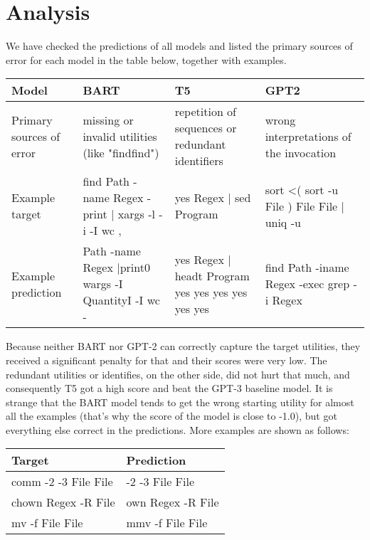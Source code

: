 \section{Analysis}
We have checked the predictions of all models and listed the primary sources of error for each model in the table below, together with examples.


\begin{center}
\begin{tabular}{ |M|L|L|L| } 
  \hline
  Model & BART & T5 & GPT2 \\ 
  \hline
  Primary sources of error & 
  missing or invalid utilities (like "findfind") & 
  repetition of sequences or redundant identifiers & 
  wrong interpretations of the invocation\\ 
  \hline
  Example target & find Path -name Regex -print | xargs -l -i -I {} wc {} {}, & 
  yes Regex | sed Program &
  sort <( sort -u File ) File File | uniq -u \\ 
  \hline
  Example prediction & 
  Path -name Regex |print0 wargs -I QuantityI -I {} wc - & yes Regex | headt Program yes yes yes yes yes yes & 
  find Path -iname Regex -exec grep -i Regex {}\\
  \hline
\end{tabular}
\end{center}

Because neither BART nor GPT-2 can correctly capture the target utilities, they received a significant penalty for that and their scores were very low. The redundant utilities or identifies, on the other side, did not hurt that much, and consequently T5 got a high score and beat the GPT-3 baseline model. It is strange that the BART model tends to get the wrong starting utility for almost all the examples (that's why the score of the model is close to -1.0), but got everything else correct in the predictions. More examples are shown as follows:
\begin{center}
\begin{tabular}{ |O|O| } 
  \hline
  Target & Prediction \\ 
  \hline
  comm -2 -3 File File & 
  -2 -3 File File\\ 
  \hline
  chown Regex -R File & 
  own Regex -R File \\ 
  \hline
  mv -f File File & mmv -f File File\\
  \hline
\end{tabular}
\end{center}

